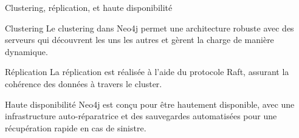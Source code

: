 \begin{frame}{Clustering, réplication, et haute disponibilité}
  \begin{block}{Clustering}
    Le clustering dans Neo4j permet une architecture robuste avec des serveurs qui découvrent les uns les autres et gèrent la charge de manière dynamique.
  \end{block}
  \begin{block}{Réplication}
    La réplication est réalisée à l'aide du protocole Raft, assurant la cohérence des données à travers le cluster.
  \end{block}
  \begin{block}{Haute disponibilité}
    Neo4j est conçu pour être hautement disponible, avec une infrastructure auto-réparatrice et des sauvegardes automatisées pour une récupération rapide en cas de sinistre.
  \end{block}
\end{frame}
